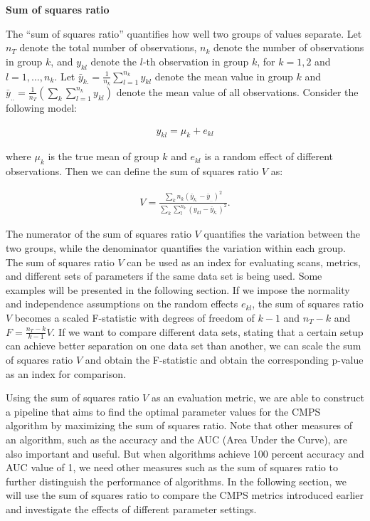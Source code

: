\textbf{Sum of squares ratio}

The ``sum of squares ratio'' quantifies how well two groups of values
separate. Let \(n_T\) denote the total number of observations, \(n_k\)
denote the number of observations in group \(k\), and \(y_{kl}\) denote
the \(l\)-th observation in group \(k\), for \(k = 1,2\) and
\(l = 1, \dots, n_k\). Let
\(\bar{y}_{k.} = \frac{1}{n_k} \sum_{l=1}^{n_k} y_{kl}\) denote the mean
value in group \(k\) and
\(\bar{y}_{..} = \frac{1}{n_T} \left( \sum_{k} \sum_{l = 1}^{n_k} y_{kl} \right)\)
denote the mean value of all observations. Consider the following model:

\begin{align}
y_{kl} = \mu_k + e_{kl}
\end{align}

where \(\mu_k\) is the true mean of group \(k\) and \(e_{kl}\) is a
random effect of different observations. Then we can define the sum of
squares ratio \(V\) as:

\begin{align}
V = \frac{\sum_k n_k \left(\bar{y}_{k.} - \bar{y}_{..} \right)^2}{\sum_k \sum_l^{n_k} \left(y_{kl} - \bar{y}_{k.} \right)^2 }.
\end{align}

The numerator of the sum of squares ratio \(V\) quantifies the variation
between the two groups, while the denominator quantifies the variation
within each group. The sum of squares ratio \(V\) can be used as an
index for evaluating scans, metrics, and different sets of parameters if
the same data set is being used. Some examples will be presented in the
following section. If we impose the normality and independence
assumptions on the random effects \(e_{kl}\), the sum of squares ratio
\(V\) becomes a scaled F-statistic with degrees of freedom of \(k-1\)
and \(n_T - k\) and \(F = \frac{n_T - k}{k- 1} V\). If we want to
compare different data sets, stating that a certain setup can achieve
better separation on one data set than another, we can scale the sum of
squares ratio \(V\) and obtain the F-statistic and obtain the
corresponding p-value as an index for comparison.

Using the sum of squares ratio \(V\) as an evaluation metric, we are
able to construct a pipeline that aims to find the optimal parameter
values for the CMPS algorithm by maximizing the sum of squares ratio.
Note that other measures of an algorithm, such as the accuracy and the
AUC (Area Under the Curve), are also important and useful. But when
algorithms achieve 100 percent accuracy and AUC value of 1, we need
other measures such as the sum of squares ratio to further distinguish
the performance of algorithms. In the following section, we will use the
sum of squares ratio to compare the CMPS metrics introduced earlier and
investigate the effects of different parameter settings.

